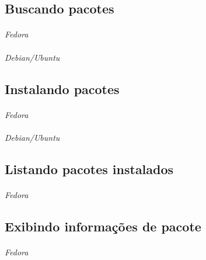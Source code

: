 \documentclass[a4paper,9pt]{extarticle}
\begin{document}
\begin{multicols}{2}
\subsection{Buscando pacotes}
	
	\paragraph{} \emph{Fedora}
	
	\paragraph{} \emph{Debian/Ubuntu}
	
\subsection{Instalando pacotes}

	\paragraph{} \emph{Fedora}
	
	\paragraph{} \emph{Debian/Ubuntu}
	
\subsection{Listando pacotes instalados}
	
	\paragraph{} \emph{Fedora}
	
\subsection{Exibindo informações de pacote}
	
	\paragraph{} \emph{Fedora}
	

\end{multicols}
\end{document}
